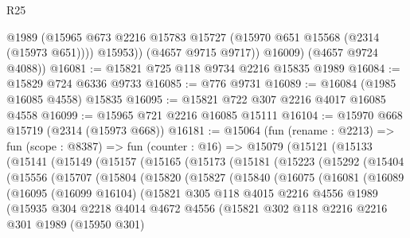 \begin{lexlean}{R25}
\begin{coremodule}
              @1989
              (@15965 @673 @2216 @15783 @15727 (@15970 @651 @15568 (@2314 (@15973 @651))))
              @15953))
          (@4657 @9715 @9717))
        @16009)
      (@4657 @9724 @4088))
@16081 := @15821 @725 @118 @9734 @2216 @15835 @1989
@16084 := @15829 @724 @6336 @9733
@16085 := @776 @9731
@16089 := @16084 (@1985 @16085 @4558) @15835
@16095 := @15821 @722 @307 @2216 @4017 @16085 @4558
@16099 := @15965 @721 @2216 @16085 @15111
@16104 := @15970 @668 @15719 (@2314 (@15973 @668))
@16181 := @15064
    (fun (rename : @2213) =>
    fun (scope : @8387) =>
    fun (counter : @16) =>
    @15079
      (@15121
        (@15133
          (@15141
            (@15149
              (@15157
                (@15165
                  (@15173
                    (@15181
                      (@15223
                        (@15292
                          (@15404
                            (@15556
                              (@15707
                                (@15804
                                  (@15820
                                    (@15827
                                      (@15840
                                        (@16075
                                          (@16081
                                            (@16089
                                              (@16095
                                                (@16099 @16104)
                                                (@15821
                                                  @305
                                                  @118
                                                  @4015
                                                  @2216
                                                  @4556
                                                  @1989
                                                  (@15935
                                                    @304
                                                    @2218
                                                    @4014
                                                    @4672
                                                    @4556
                                                    (@15821
                                                      @302
                                                      @118
                                                      @2216
                                                      @2216
                                                      @301
                                                      @1989
                                                      (@15950 @301)

\end{coremodule}
\end{lexlean}
